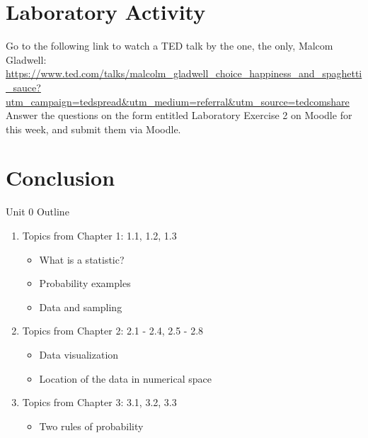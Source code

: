 \documentclass{beamer}
\begin{document}
\section{Laboratory Activity}

\begin{frame}
Go to the following link to watch a TED talk by the one, the only, Malcom Gladwell: \\ \vspace{1cm}
\url{https://www.ted.com/talks/malcolm_gladwell_choice_happiness_and_spaghetti_sauce?utm_campaign=tedspread&utm_medium=referral&utm_source=tedcomshare} \\ \vspace{1cm}
Answer the questions on the form entitled \alert{Laboratory Exercise 2} on Moodle for this week, and submit them via Moodle.
\end{frame}

\section{Conclusion}

\begin{frame}{Unit 0 Outline}
\begin{enumerate}
\item Topics from Chapter 1: 1.1, 1.2, 1.3
\begin{itemize}
\item What is a statistic?
\item Probability examples
\item Data and sampling
\end{itemize}
\item Topics from Chapter 2: 2.1 - 2.4, 2.5 - 2.8
\begin{itemize}
\item Data visualization
\item Location of the data in numerical space
\end{itemize}
\item Topics from Chapter 3: 3.1, 3.2, 3.3
\begin{itemize}
\item Two rules of probability
\end{itemize}
\end{enumerate}
\end{frame}
\end{document}
